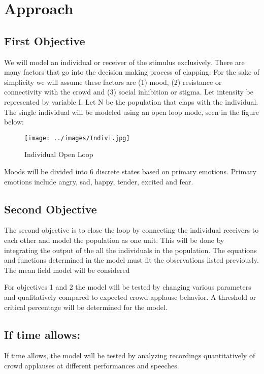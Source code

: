 \documentclass[12pt,letterpaper]{article}
\theoremstyle{definition}
\begin{document}
\section{Approach}
\subsection{First Objective}%
We will model an individual or receiver of the stimulus exclusively. There are many factors that go into the decision making process of clapping. For the sake of simplicity we will assume these factors are (1) mood, (2) resistance or connectivity with the crowd and (3) social inhibition or stigma.
Let intensity be represented by variable I. Let N be the population that claps with the individual. 
The single individual will be modeled using an open loop mode, seen in the figure below:
\begin{figure}[h]
    \begin{center}
        \texttt{[image: ../images/Indivi.jpg]}
    \end{center}
    \caption{Individual Open Loop}
    \label{fig:Indivi}
\end{figure} 

Moods will be divided into 6 discrete states based on primary emotions. Primary emotions include angry, sad, happy, tender, excited and fear. 
\subsection{Second Objective}%

The second objective is to close the loop by connecting the individual receivers to each other and model the population as one unit. This will be done by integrating the output of the all the individuals in the population. The equations and functions determined in the model must fit the observations listed previously. The mean field model will be considered


For objectives 1 and 2 the model will be tested by changing various parameters and qualitatively compared to expected crowd applause behavior. A threshold or critical percentage will be determined for the model. 
\subsection{If time allows:}

If time allows, the model will be tested by analyzing recordings quantitatively of crowd applauses at different performances and speeches.
\end{document}
